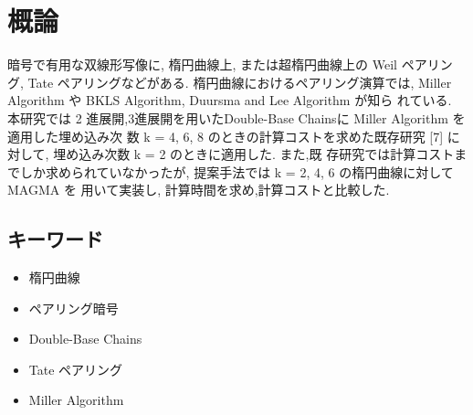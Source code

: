 \chapter*{概論}
暗号で有用な双線形写像に, 楕円曲線上, または超楕円曲線上の Weil ペアリング, Tate ペアリングなどがある. 楕円曲線におけるペアリング演算では, Miller Algorithm や BKLS Algorithm, Duursma and Lee Algorithm が知ら れている. 本研究では 2 進展開,3進展開を用いたDouble-Base Chainsに Miller Algorithm を適用した埋め込み次 数 k = 4, 6, 8 のときの計算コストを求めた既存研究 [7] に対して, 埋め込み次数 k = 2 のときに適用した. また,既 存研究では計算コストまでしか求められていなかったが, 提案手法では k = 2, 4, 6 の楕円曲線に対して MAGMA を 用いて実装し, 計算時間を求め,計算コストと比較した.

\bigskip

\section*{キーワード}
\begin{itemize}
\item 楕円曲線
\item ペアリング暗号
\item Double-Base Chains
\item Tate  ペアリング
\item Miller Algorithm
\end{itemize}
